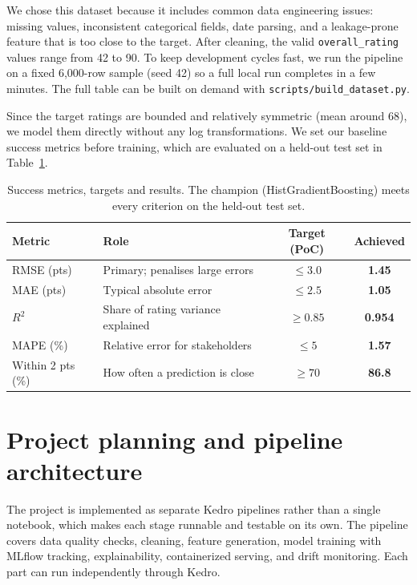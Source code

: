 \documentclass[11pt,a4paper]{article}
\newcommand{\code}[1]{\texttt{\small #1}}
\begin{document}
We chose this dataset because it includes common data engineering issues: missing values, inconsistent categorical fields, date parsing, and a leakage-prone feature that is too close to the target. After cleaning, the valid \code{overall\_rating} values range from 42 to 90. To keep development cycles fast, we run the pipeline on a fixed 6,000-row sample (seed 42) so a full local run completes in a few minutes. The full table can be built on demand with \code{scripts/build\_dataset.py}.

Since the target ratings are bounded and relatively symmetric (mean around 68), we model them directly without any log transformations. We set our baseline success metrics before training, which are evaluated on a held-out test set in Table~\ref{tab:metrics}.

\begin{table}[H]
\centering
\small
\begin{tabular}{@{}llcc@{}}
\toprule
\textbf{Metric} & \textbf{Role} & \textbf{Target (PoC)} & \textbf{Achieved} \\
\midrule
RMSE (pts)            & Primary; penalises large errors        & $\leq 3.0$  & \textbf{1.45} \\
MAE (pts)             & Typical absolute error                  & $\leq 2.5$  & \textbf{1.05} \\
$R^2$                 & Share of rating variance explained      & $\geq 0.85$ & \textbf{0.954} \\
MAPE (\%)             & Relative error for stakeholders         & $\leq 5$    & \textbf{1.57} \\
Within 2 pts (\%)     & How often a prediction is close         & $\geq 70$   & \textbf{86.8} \\
\bottomrule
\end{tabular}
\caption{Success metrics, targets and results. The champion (HistGradientBoosting) meets every
criterion on the held-out test set.}
\label{tab:metrics}
\end{table}

\section{Project planning and pipeline architecture}
The project is implemented as separate Kedro pipelines rather than a single notebook, which makes each stage runnable and testable on its own. The pipeline covers data quality checks, cleaning, feature generation, model training with MLflow tracking, explainability, containerized serving, and drift monitoring. Each part can run independently through Kedro.
\end{document}
